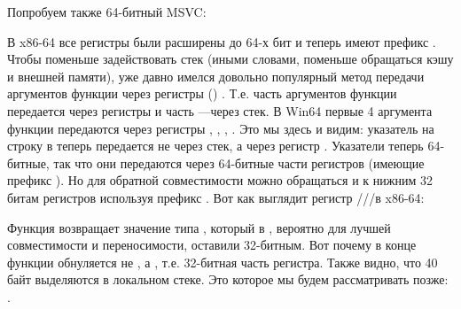
Попробуем также 64-битный MSVC:




В x86-64 все регистры были расширены до 64-х бит и теперь имеют префикс .
Чтобы поменьше задействовать стек (иными словами, поменьше обращаться кэшу и внешней памяти), уже давно имелся
довольно популярный метод передачи аргументов функции через регистры () .
Т.е. часть аргументов функции передается через регистры и часть ---через стек.
В Win64 первые 4 аргумента функции передаются через регистры \RCX, \RDX, , .
Это мы здесь и видим: указатель на строку в \printf теперь передается не через стек, а через регистр \RCX.
Указатели теперь 64-битные, так что они передаются через 64-битные части регистров (имеющие префикс ).
Но для обратной совместимости можно обращаться и к нижним 32 битам регистров используя префикс .
Вот как выглядит регистр \RAX/\EAX/\AX/\AL в x86-64:


Функция \main возвращает значение типа \Tint, который в \CCpp, вероятно для лучшей совместимости и переносимости,
оставили 32-битным. Вот почему в конце функции \main обнуляется не \RAX, а \EAX, т.е. 32-битная часть регистра.
Также видно, что 40 байт выделяются в локальном стеке.
Это  которое мы будем рассматривать позже: .
